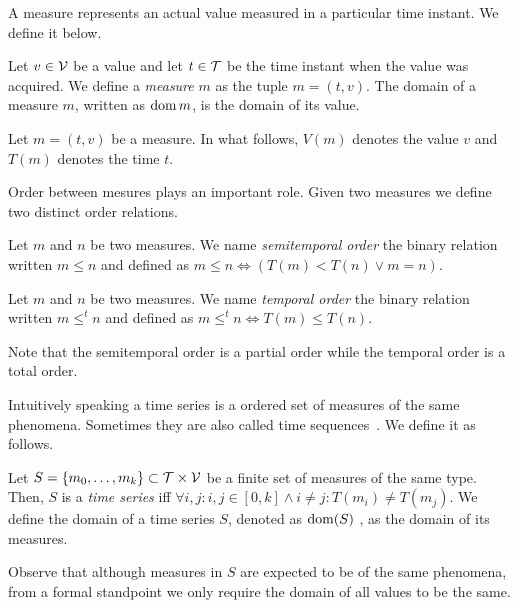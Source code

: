A measure represents an actual value measured in a particular time
instant. We define it below.

\begin{definition}
  Let $v\in\cal{V}$ be a value and let $t\in\cal{T}$ be the time
  instant when the value was acquired. We define a \emph{measure} $m$
  as the tuple $m=(t,v)$. The domain of a measure $m$, written as
  $\operatorname{dom} m$, is the domain of its value.
\end{definition}

Let $m = (t,v)$ be a measure. In what follows, $V(m)$ denotes the
value $v$ and $T(m)$ denotes the time $t$.

Order between mesures plays an important role. Given two measures we
define two distinct order relations.

\begin{definition}
  Let $m$ and $n$ be two measures. We name \emph{semitemporal order}
  the binary relation written $m\leq n$ and defined as $m\leq n\iff
  (T(m)<T(n) \vee m=n)$.
\end{definition}

\begin{definition} Let $m$ and $n$ be two measures. We
    name \emph{temporal order} the binary relation written $m \leq^t
    n$ and defined as $m \leq^t n \iff T(m) \leq T(n)$.
\end{definition}

Note that the semitemporal order is a partial order while the temporal
order is a total order.

Intuitively speaking a time series is a ordered set of measures of the
same phenomena.  Sometimes they are also called time
sequences~\cite{last:hetland}. We define it as follows.

\begin{definition}
  \label{def:model:timeseries}
  Let $S = \{m_0,\ldots,m_k\}\subset\cal{T}\times\cal{V}$ be a finite
  set of measures of the same type. Then, $S$ is a \emph{time series}
  iff $\forall i,j: i,j\in[0,k] \wedge i\neq j: T(m_i)\neq T(m_j)$.
  We define the domain of a time series $S$, denoted as $\operatorname{dom}(S)$ , as
  the domain of its measures.
\end{definition}

Observe that although measures in $S$ are expected to be of the same
phenomena, from a formal standpoint we only require the domain of all
values to be the same. 


